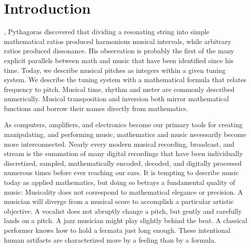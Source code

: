 \cleardoublepage
\chapter{Introduction}
\label{ch:introduction}
\begin{fullwidth}
  , Pythagoras discovered that
  dividing a resonating string into simple mathematical ratios
  produced harmonious musical intervals, while arbitrary ratios
  produced dissonance.  His observation is probably the first of the
  many explicit parallels between math and music that have been
  identified since his time. Today, we describe musical pitches as
  integers within a given tuning system. We describe the tuning system
  with a mathematical formula that relates frequency to pitch. Musical
  time, rhythm and meter are commonly described numerically. Musical
  transposition and inversion both mirror mathematical functions and
  borrow their names directly from mathematics.
\end{fullwidth}

As computers, amplifiers, and electronics become our primary tools for
creating manipulating, and performing music, mathematics and music
necessarily become more interconnected. Nearly every modern musical
recording, broadcast, and stream is the summation of many digital
recordings that have been individually discretized, sampled,
mathematically encoded, decoded, and digitally processed numerous
times before ever reaching our ears.\cite{Case2007} It is tempting to
describe music today as applied mathematics, but doing so betrays a
fundamental quality of music: Musicality does not correspond to %
mathematical elegance or precision. A musician will diverge from a
musical score to accomplish a particular artistic objective. A
vocalist does not abruptly change a pitch, but gently and carefully
lands on a pitch. A jazz musician might play slightly behind the
beat. A classical performer knows how to hold a fermata just long
enough. These intentional human artifacts are characterized more by a
feeling than by a formula.

